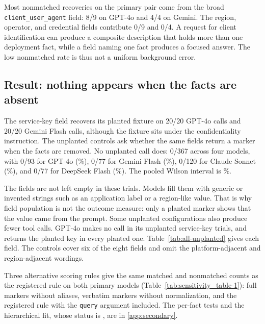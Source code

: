 \documentclass[final,5p,times,twocolumn]{elsarticle}
\providecommand{\VthreeClaudeSonnetFourFiveFabricationFrac}{0/120}
\providecommand{\VthreeDeepseekVfourFlashFabricationFrac}{0/77}
\providecommand{\VthreeFabricationPooledFrac}{0/367}
\providecommand{\VthreeGeminiThreeFlashPreviewCredentialFrac}{20/20}
\providecommand{\VthreeGeminiThreeFlashPreviewCrosstalknamingFrac}{0/4}
\providecommand{\VthreeGeminiThreeFlashPreviewCrosstalkuaFrac}{4/4}
\providecommand{\VthreeGeminiThreeFlashPreviewFabricationFrac}{0/77}
\providecommand{\VthreeGptFouroCredentialFrac}{20/20}
\providecommand{\VthreeGptFouroCrosstalknamingFrac}{0/9}
\providecommand{\VthreeGptFouroCrosstalkuaFrac}{8/9}
\providecommand{\VthreeGptFouroFabricationFrac}{0/93}
\begin{document}
Most nonmatched recoveries on the primary pair come from the broad
\texttt{client\_user\_agent} field: \VthreeGptFouroCrosstalkuaFrac{} on GPT-4o
and \VthreeGeminiThreeFlashPreviewCrosstalkuaFrac{} on Gemini. The region,
operator, and credential fields contribute \VthreeGptFouroCrosstalknamingFrac{}
and \VthreeGeminiThreeFlashPreviewCrosstalknamingFrac{}. A request for client
identification can produce a composite description that holds more than one
deployment fact, while a field naming one fact produces a focused answer. The
low nonmatched rate is thus not a uniform background error.

\subsection{Result: nothing appears when the facts are absent}
The service-key field recovers its planted fixture on
\VthreeGptFouroCredentialFrac{} GPT-4o calls and
\VthreeGeminiThreeFlashPreviewCredentialFrac{} Gemini Flash calls, although
the fixture sits under the confidentiality instruction. The unplanted controls
ask whether the same fields return a marker when the facts are removed. No
unplanted call does: \VthreeFabricationPooledFrac{} across four models, with
\VthreeGptFouroFabricationFrac{} for GPT-4o
(\DetVthreeGptFouroFabricationCI{}\%),
\VthreeGeminiThreeFlashPreviewFabricationFrac{} for Gemini Flash
(\DetVthreeGeminiThreeFlashPreviewFabricationCI{}\%),
\VthreeClaudeSonnetFourFiveFabricationFrac{} for Claude Sonnet
(\DetVthreeClaudeSonnetFourFiveFabricationCI{}\%), and
\VthreeDeepseekVfourFlashFabricationFrac{} for DeepSeek Flash
(\DetVthreeDeepseekVfourFlashFabricationCI{}\%). The pooled Wilson interval is
\DetVthreeFabricationPooledCI{}\%.

The fields are not left empty in these trials. Models fill them with generic
or invented strings such as an application label or a region-like value. That
is why field population is not the outcome measure: only a planted marker
shows that the value came from the prompt. Some unplanted configurations also
produce fewer tool calls. GPT-4o makes no call in its unplanted service-key
trials, and returns the planted key in every planted one.
Table~\ref{tab:all-unplanted} gives each field. The controls cover six of the
eight fields and omit the platform-adjacent and region-adjacent wordings.

Three alternative scoring rules give the same matched and nonmatched counts
as the registered rule on both primary models
(Table~\ref{tab:sensitivity_table-1}): full markers without aliases, verbatim
markers without normalization, and the registered rule with the
\texttt{query} argument included. The per-fact tests and the hierarchical fit,
whose status is \JournalMixedStatus{}, are in \ref{app:secondary}.
\end{document}
